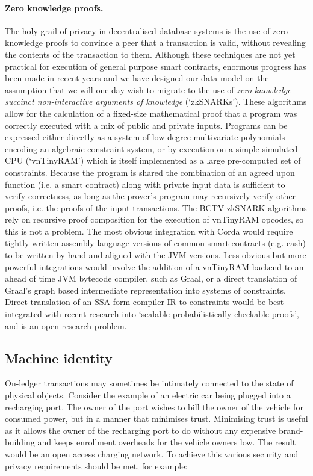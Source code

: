 \documentclass{article}
\begin{document}
\paragraph{Zero knowledge proofs.}The holy grail of privacy in decentralised database systems is the use of zero
knowledge proofs to convince a peer that a transaction is valid, without revealing the contents of the transaction
to them. Although these techniques are not yet practical for execution of general purpose smart contracts, enormous
progress has been made in recent years and we have designed our data model on the assumption that we will one day
wish to migrate to the use of \emph{zero knowledge succinct non-interactive arguments of knowledge}\cite{184425}
(`zkSNARKs'). These algorithms allow for the calculation of a fixed-size mathematical proof that a program was
correctly executed with a mix of public and private inputs. Programs can be expressed either directly as a system
of low-degree multivariate polynomials encoding an algebraic constraint system, or by execution on a simple
simulated CPU (`vnTinyRAM') which is itself implemented as a large pre-computed set of constraints. Because the
program is shared the combination of an agreed upon function (i.e. a smart contract) along with private input data
is sufficient to verify correctness, as long as the prover's program may recursively verify other proofs, i.e. the
proofs of the input transactions. The BCTV zkSNARK algorithms rely on recursive proof composition for the execution
of vnTinyRAM opcodes, so this is not a problem. The most obvious integration with Corda would require tightly
written assembly language versions of common smart contracts (e.g. cash) to be written by hand and aligned with the
JVM versions. Less obvious but more powerful integrations would involve the addition of a vnTinyRAM backend to an
ahead of time JVM bytecode compiler, such as Graal\cite{Graal}, or a direct translation of Graal's graph based
intermediate representation into systems of constraints. Direct translation of an SSA-form compiler IR to
constraints would be best integrated with recent research into `scalable probabilistically checkable
proofs'\cite{cryptoeprint:2016:646}, and is an open research problem.

\subsection{Machine identity}\label{subsec:machine-identity}

On-ledger transactions may sometimes be intimately connected to the state of physical objects. Consider the example
of an electric car being plugged into a recharging port. The owner of the port wishes to bill the owner of the
vehicle for consumed power, but in a manner that minimises trust. Minimising trust is useful as it allows the
owner of the recharging port to do without any expensive brand-building and keeps enrollment overheads for the
vehicle owners low. The result would be an open access charging network. To achieve this various security and
privacy requirements should be met, for example:
\end{document}
